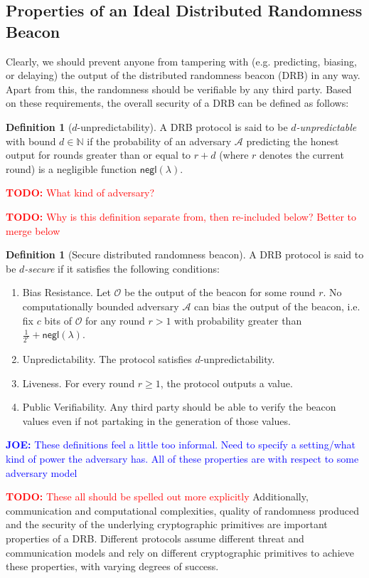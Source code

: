\documentclass[letterpaper,twocolumn,10pt]{article}
\theoremstyle{definition}
\newtheorem{definition}[theorem]{Definition}
\theoremstyle{remark}
\newcommand{\todo}[1]{\textcolor{red}{\textbf{TODO:} #1}}
\newcommand{\joenote}[1]{\textcolor{blue}{\textbf{JOE:} #1}}
\begin{document}
\subsection{Properties of an Ideal Distributed Randomness Beacon}
Clearly, we should prevent anyone from tampering with (e.g. predicting, biasing, or delaying) the output of the distributed randomness beacon (DRB) in any way. Apart from this, the randomness should be verifiable by any third party. Based on these requirements, the overall security of a DRB can be defined as follows:

\begin{definition}[$d$-unpredictability]
A DRB protocol is said to be \textit{$d$-unpredictable} with bound $d \in \mathbb{N}$ if the probability of an adversary $\mathcal{A}$ predicting the honest output for rounds greater than or equal to $r + d$ (where $r$ denotes the current round) is a negligible function $\mathsf{negl}(\lambda)$.
\end{definition}
\todo{What kind of adversary?}

\todo{Why is this definition separate from, then re-included below? Better to merge below}

\begin{definition}[Secure distributed randomness beacon]
A DRB protocol is said to be \textit{$d$-secure} if it satisfies the following conditions:
\begin{enumerate}
\item Bias Resistance. Let $\mathcal{O}$ be the output of the beacon for some round $r$. No computationally bounded adversary $\mathcal{A}$ can bias the output of the beacon, i.e. fix $c$ bits of $\mathcal{O}$ for any round $r > 1$ with probability greater than $\frac{1}{2^c} + \mathsf{negl}(\lambda)$.
\item Unpredictability. The protocol satisfies $d$-unpredictability.
\item Liveness. For every round $r \geq 1$, the protocol outputs a value.
\item Public Verifiability. Any third party should be able to verify the beacon values even if not partaking in the generation of those values.
\end{enumerate}
\end{definition}
\joenote{These definitions feel a little too informal. Need to specify a setting/what kind of power the adversary has. All of these properties are with respect to some adversary model}

\todo{These all should be spelled out more explicitly}
Additionally, communication and computational complexities, quality of randomness produced and the security of the underlying cryptographic primitives are important properties of a DRB. Different protocols assume different threat and communication models and rely on different cryptographic primitives to achieve these properties, with varying degrees of success. 
\end{document}
